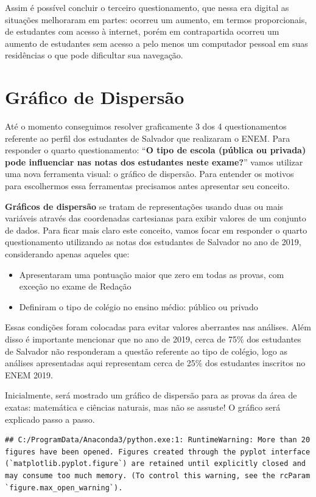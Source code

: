 \documentclass[
  oneside]{book}
\begin{document}
Assim é possível concluir o terceiro questionamento, que nessa era digital as situações melhoraram em partes: ocorreu um aumento, em termos proporcionais, de estudantes com acesso à internet, porém em contrapartida ocorreu um aumento de estudantes sem acesso a pelo menos um computador pessoal em suas residências o que pode dificultar sua navegação.

\hypertarget{gdisp}{%
\section{Gráfico de Dispersão}\label{gdisp}}

Até o momento conseguimos resolver graficamente 3 dos 4 questionamentos referente ao perfil dos estudantes de Salvador que realizaram o ENEM. Para responder o quarto questionamento: ``\textbf{O tipo de escola (pública ou privada) pode influenciar nas notas dos estudantes neste exame?}'' vamos utilizar uma nova ferramenta visual: o gráfico de dispersão. Para entender os motivos para escolhermos essa ferramentas precisamos antes apresentar seu conceito.

\textbf{Gráficos de dispersão} se tratam de representações usando duas ou mais variáveis através das coordenadas cartesianas para exibir valores de um conjunto de dados. Para ficar mais claro este conceito, vamos focar em responder o quarto questionamento utilizando as notas dos estudantes de Salvador no ano de 2019, considerando apenas aqueles que:

\begin{itemize}
\item
  Apresentaram uma pontuação maior que zero em todas as provas, com exceção no exame de Redação
\item
  Definiram o tipo de colégio no ensino médio: público ou privado
\end{itemize}

Essas condições foram colocadas para evitar valores aberrantes nas análises. Além disso é importante mencionar que no ano de 2019, cerca de 75\% dos estudantes de Salvador não responderam a questão referente ao tipo de colégio, logo as análises apresentadas aqui representam cerca de 25\% dos estudantes inscritos no ENEM 2019.

Inicialmente, será mostrado um gráfico de dispersão para as provas da área de exatas: matemática e ciências naturais, mas não se assuste! O gráfico será explicado passo a passo.

\begin{verbatim}
## C:/ProgramData/Anaconda3/python.exe:1: RuntimeWarning: More than 20 figures have been opened. Figures created through the pyplot interface (`matplotlib.pyplot.figure`) are retained until explicitly closed and may consume too much memory. (To control this warning, see the rcParam `figure.max_open_warning`).
\end{verbatim}
\end{document}
